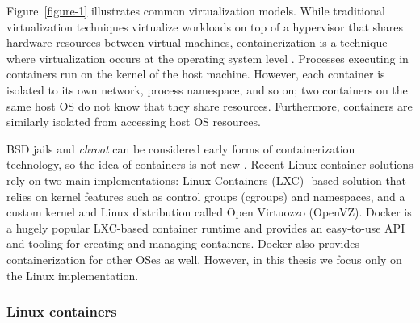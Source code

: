 \documentclass[english, 12pt, a4paper, sci, utf8, a-2b, online]{aaltothesis}
\begin{document}
Figure~\ref{figure-1} illustrates common virtualization models.
While traditional virtualization techniques virtualize workloads on top of a hypervisor that shares hardware resources between virtual machines, containerization is a technique where virtualization occurs at the operating system level \cite{merkel2014docker}.
Processes executing in containers run on the kernel of the host machine.
However, each container is isolated to its own network, process namespace, and so on; two containers on the same host OS do not know that they share resources.
Furthermore, containers are similarly isolated from accessing host OS resources.

BSD jails and \emph{chroot} can be considered early forms of containerization technology, so the idea of containers is not new \cite{combe2016docker}.
Recent Linux container solutions rely on two main implementations: Linux Containers (LXC) -based solution that relies on kernel features such as control groups (cgroups) and namespaces, and a custom kernel and Linux distribution called Open Virtuozzo (OpenVZ).
Docker \cite{docker} is a hugely popular LXC-based container runtime and provides an easy-to-use API and tooling for creating and managing containers.
Docker also provides containerization for other OSes as well.
However, in this thesis we focus only on the Linux implementation.

\subsubsection{Linux containers}
\end{document}
